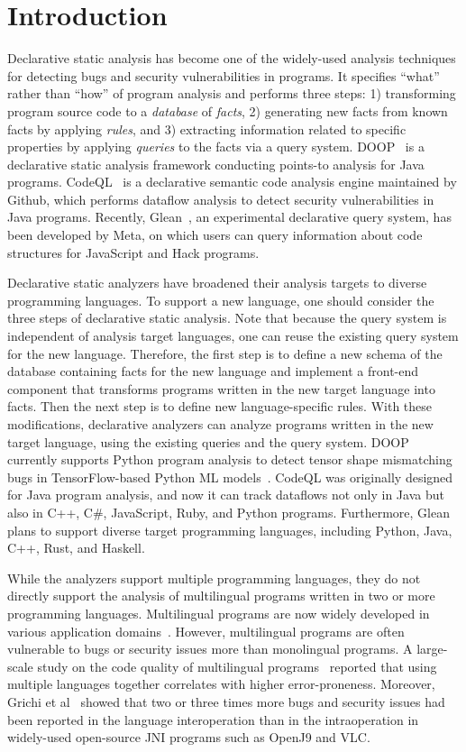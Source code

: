\section{Introduction}
Declarative static analysis has become one of the widely-used analysis techniques
for detecting bugs and security vulnerabilities in programs.
It specifies ``what'' rather than ``how'' of program analysis and
performs three steps:
1) transforming program source code to a {\it database}
of {\it facts}, 2) generating new facts from known facts by applying
{\it rules}, and 3) extracting information related to specific properties by
applying {\it queries} to the facts via a query system.  DOOP~\cite{doop} is a
declarative static analysis framework conducting points-to analysis for Java
programs. CodeQL~\cite{codeql} is a declarative semantic code analysis engine
maintained by Github, which performs dataflow analysis to detect security
vulnerabilities in Java programs.  Recently, Glean~\cite{glean}, an experimental
declarative query system, has been developed by Meta, on which users can query
information about code structures for JavaScript and Hack programs.

Declarative static analyzers have broadened their analysis targets to diverse
programming languages. To support a new language, one should consider
the three steps of declarative static analysis. Note that because the query
system is independent of analysis target languages, one can reuse the
existing query system for the new language. Therefore, the first step
is to define a new schema of the database containing facts for the new
language and implement a
front-end component that transforms programs written in the new target language into facts.
Then the next step is to define new language-specific rules.  With these
modifications, declarative analyzers can analyze programs written in the new
target language, using the existing queries and the query system.  DOOP currently
supports Python program analysis to detect tensor shape mismatching bugs in
TensorFlow-based Python ML models~\cite{lagouvardos2020static}. CodeQL was
originally designed for Java program analysis, and now it can track dataflows not only
in Java but also in C++, C\#, JavaScript, Ruby, and Python programs.
Furthermore, Glean plans to support diverse target programming languages,
including Python, Java, C++, Rust, and Haskell.

While the analyzers support multiple programming languages, they do not directly
support the analysis of multilingual programs written in two or more
programming languages. Multilingual programs are now widely developed in
various application domains~\cite{kochhar2016large, mergendahlcross}. However,
multilingual programs are often vulnerable to bugs or security issues more than
monolingual programs. A large-scale study on the code quality of multilingual
programs~\cite{kochhar2016large} reported that using multiple languages
together correlates with higher error-proneness. Moreover,
Grichi et al~\cite{grichi2020impact} showed that two or three times more bugs and security
issues had been reported in the language interoperation than in the
intraoperation in widely-used open-source JNI programs such as OpenJ9 and VLC.

